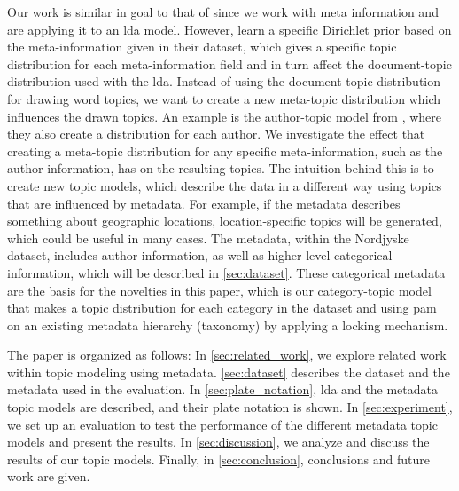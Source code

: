 Our work is similar in goal to that of \citet{MetaLDA2017} since we work with meta information and are applying it to an \gls{lda} model.
However, \citet{MetaLDA2017} learn a specific Dirichlet prior based on the meta-information given in their dataset, which gives a specific topic distribution for each meta-information field and in turn affect the document-topic distribution used with the \gls{lda}.
Instead of using the document-topic distribution for drawing word topics, we want to create a new meta-topic distribution which influences the drawn topics.
An example is the author-topic model from \citet{author_topic_2012}, where they also create a distribution for each author.
We investigate the effect that creating a meta-topic distribution for any specific meta-information, such as the author information, has on the resulting topics.
The intuition behind this is to create new topic models, which describe the data in a different way using topics that are influenced by metadata.
For example, if the metadata describes something about geographic locations, location-specific topics will be generated, which could be useful in many cases.
The metadata, within the Nordjyske dataset, includes author information, as well as higher-level categorical information, which will be described in \autoref{sec:dataset}.
These categorical metadata are the basis for the novelties in this paper, which is our category-topic model that makes a topic distribution for each category in the dataset and using \gls{pam} on an existing metadata hierarchy (taxonomy) by applying a locking mechanism.

The paper is organized as follows:
In \autoref{sec:related_work}, we explore related work within topic modeling using metadata.
\autoref{sec:dataset} describes the dataset and the metadata used in the evaluation.
In \autoref{sec:plate_notation}, \gls{lda} and the metadata topic models are described, and their plate notation is shown.
In \autoref{sec:experiment}, we set up an evaluation to test the performance of the different metadata topic models and present the results.
In \autoref{sec:discussion}, we analyze and discuss the results of our topic models.
Finally, in \autoref{sec:conclusion}, conclusions and future work are given.
